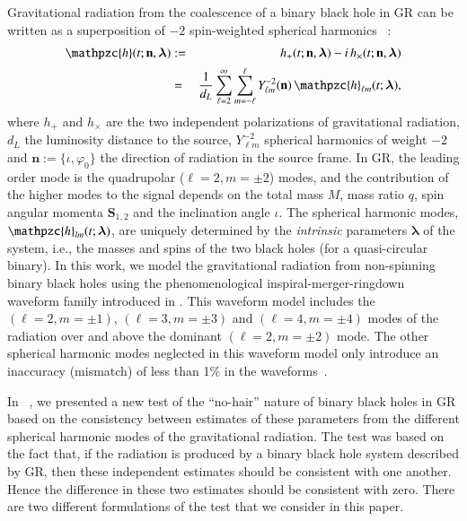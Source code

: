 \documentclass[prd,preprintnumbers,twocolumn,eqsecnum,floatfix,a4paper,nofootinbib,superscriptaddress]{revtex4}
\newcommand{\h}{\mathpzc{h}}
\newcommand{\hlm}{\mathpzc{h}_{\ell m}}
\newcommand{\Ylm}{{Y}^{-2}_{\ell m}}
\newcommand{\blambda}{\bm{\lambda}}
\newcommand{\n}{\mathbf{n}}
\begin{document}
Gravitational radiation from the coalescence of a binary black hole in GR can be written as a superposition of $-2$ spin-weighted spherical harmonics ~\cite{NewmanPenrose}:
\begin{eqnarray}
\h(t; \n, \blambda) &:=& h_+(t; \n, \blambda) - i \, h_\times(t; \n, \blambda) \\
&=& \frac{1}{d_L} \sum _{\ell=2}^{\infty} \sum _{m=-\ell}^{\ell} {\Ylm} (\n) \, {{\hlm}(t; {\blambda})}, 
\label{eq:spherical_harmonics}
\end{eqnarray}
where $h_+$ and $h_{\times}$ are the two independent polarizations of gravitational radiation, $d_L$ the luminosity distance to the source, ${\Ylm}$ spherical harmonics of weight $-2$ and $\n := \{\iota, \varphi_0\}$ the direction of radiation in the source frame. In GR, the leading order mode is the quadrupolar ($\ell = 2, m = \pm 2$) modes, and the contribution of the higher modes to the signal depends on the total mass $M$, mass ratio $q$, spin angular momenta ${\mathbf S}_{1,2}$ and the inclination angle $\iota$.  The spherical harmonic modes, ${\h}_{lm}(t; \blambda)$, are uniquely determined by the \emph{intrinsic} parameters $\blambda$ of the system, i.e., the masses and spins of the two black holes (for a quasi-circular binary). In this work, we model the gravitational radiation from non-spinning binary black holes using the phenomenological inspiral-merger-ringdown waveform family introduced in \cite{Mehta:2017jpq}. This waveform model includes the $(\ell = 2, m=\pm1)$, $(\ell = 3, m=\pm3)$ and $(\ell = 4, m = \pm4)$  modes of the radiation over and above the dominant $(\ell = 2, m = \pm2)$ mode. The other spherical harmonic modes neglected in this waveform model only introduce an inaccuracy (mismatch) of less than 1\% in the waveforms~\cite{Mehta:2017jpq}. 

In ~\cite{Dhanpal:2018ufk}, we presented a new test of the ``no-hair'' nature of binary black holes in GR based on the consistency between estimates of these parameters from the different spherical harmonic modes of the gravitational radiation. The test was based on the fact that, if the radiation is produced by a binary black hole system described by GR, then these independent estimates should be consistent with one another. Hence the difference in these two estimates should be consistent with zero. There are two different formulations of the test that we consider in this paper.
\end{document}
